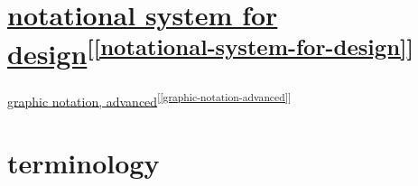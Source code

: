 \documentclass[
]{book}
\theoremstyle{definition}
\theoremstyle{definition}
\theoremstyle{definition}
\theoremstyle{definition}
\theoremstyle{remark}
\begin{document}
\hypertarget{notational-system-for-designrefnotational-system-for-design}{%
\section{\texorpdfstring{\protect\hyperlink{notational-system-for-design}{notational system for design}\textsuperscript{{[}\ref{notational-system-for-design}{]}}}{notational system for design{[}\ref{notational-system-for-design}{]}}}\label{notational-system-for-designrefnotational-system-for-design}}

\protect\hyperlink{graphic-notation-advanced}{graphic notation, advanced}\textsuperscript{{[}\ref{graphic-notation-advanced}{]}}

\hypertarget{terminology}{%
\section{terminology}\label{terminology}}
\end{document}

